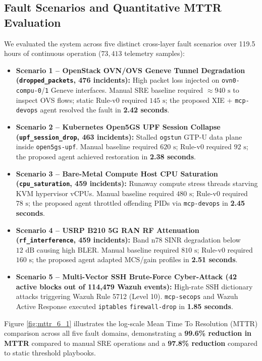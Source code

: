 \subsection{Fault Scenarios and Quantitative MTTR Evaluation}
We evaluated the system across five distinct cross-layer fault scenarios over 119.5 hours of continuous operation ($73,413$ telemetry samples):
\begin{itemize}
    \item \textbf{Scenario 1 -- OpenStack OVN/OVS Geneve Tunnel Degradation (\texttt{dropped\_packets}, 476 incidents):} High packet loss injected on \texttt{ovn0-compu-0}/\texttt{1} Geneve interfaces. Manual SRE baseline required $\approx 940\text{ s}$ to inspect OVS flows; static Rule-v0 required $145\text{ s}$; the proposed XIE + \texttt{mcp-devops} agent resolved the fault in \textbf{2.42 seconds}.
    \item \textbf{Scenario 2 -- Kubernetes Open5GS UPF Session Collapse (\texttt{upf\_session\_drop}, 463 incidents):} Stalled \texttt{ogstun} GTP-U data plane inside \texttt{open5gs-upf}. Manual baseline required $620\text{ s}$; Rule-v0 required $92\text{ s}$; the proposed agent achieved restoration in \textbf{2.38 seconds}.
    \item \textbf{Scenario 3 -- Bare-Metal Compute Host CPU Saturation (\texttt{cpu\_saturation}, 459 incidents):} Runaway compute stress threads starving KVM hypervisor vCPUs. Manual baseline required $480\text{ s}$; Rule-v0 required $78\text{ s}$; the proposed agent throttled offending PIDs via \texttt{mcp-devops} in \textbf{2.45 seconds}.
    \item \textbf{Scenario 4 -- USRP B210 5G RAN RF Attenuation (\texttt{rf\_interference}, 459 incidents):} Band n78 SINR degradation below $12\text{ dB}$ causing high BLER. Manual baseline required $810\text{ s}$; Rule-v0 required $160\text{ s}$; the proposed agent adapted MCS/gain profiles in \textbf{2.51 seconds}.
    \item \textbf{Scenario 5 -- Multi-Vector SSH Brute-Force Cyber-Attack (42 active blocks out of 114,479 Wazuh events):} High-rate SSH dictionary attacks triggering Wazuh Rule 5712 (Level 10). \texttt{mcp-secops} and Wazuh Active Response executed \texttt{iptables} \texttt{firewall-drop} in \textbf{1.85 seconds}.
\end{itemize}

Figure \ref{fig:mttr_6_1} illustrates the log-scale Mean Time To Resolution (MTTR) comparison across all five fault domains, demonstrating a \textbf{99.6\% reduction in MTTR} compared to manual SRE operations and a \textbf{97.8\% reduction} compared to static threshold playbooks.


